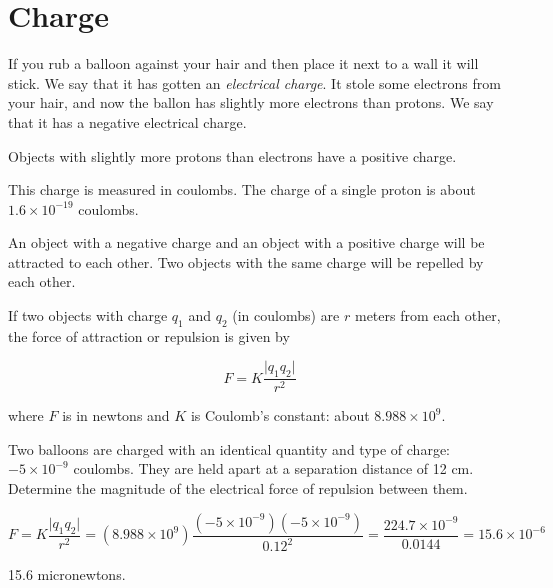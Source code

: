 \chapter{Charge}

If you rub a balloon against your hair and then place it next to a wall it will stick. We
say that it has gotten an \textit{electrical charge}. It stole some
electrons from your hair, and now the ballon has slightly more
electrons than protons. We say that it has a negative electrical
charge.

Objects with slightly more protons than electrons have a positive charge.

This charge is measured in coulombs. The charge of a single proton is
about $1.6 \times 10^{-19}$ coulombs.

An object with a negative charge and an object with a positive charge
will be attracted to each other. Two objects with the same charge will
be repelled by each other.

\begin{mdframed}[style=important, frametitle={Coulomb's Law}]

  If two objects with charge $q_1$ and $q_2$ (in coulombs) are $r$ meters from each other, the force of attraction or repulsion is given by

  $$F = K\frac{\lvert q_1 q_2 \rvert}{r^2}$$

    where $F$ is in newtons and $K$ is Coulomb's constant: about $8.988 \times 10^9$.
  
\end{mdframed}


\begin{Exercise}[title={Coulomb's Law}, label=charged_balloons]

Two balloons are charged with an identical quantity and type of
charge: $-5 \times 10^{-9}$ coulombs. They are held apart at a
separation distance of 12 cm. Determine the magnitude of the
electrical force of repulsion between them. 
  
\end{Exercise}
\begin{Answer}[ref=charged_balloons]

  $$F = K\frac{\lvert q_1 q_2 \rvert}{r^2} = (8.988 \times 10^9) \frac{(-5 \times 10^{-9})(-5 \times 10^{-9})}{0.12^2} = \frac{224.7 \times 10^{-9}}{0.0144} = 15.6 \times 10^{-6}$$

  15.6 micronewtons.
  
\end{Answer}

